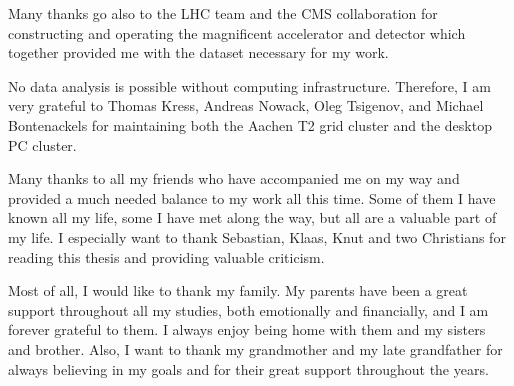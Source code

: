 Many thanks go also to the LHC team and the CMS collaboration for constructing and operating the magnificent accelerator and detector which together provided me with the dataset necessary for my work.    

No data analysis is possible without computing infrastructure. Therefore, I am very grateful to Thomas Kress, Andreas Nowack, Oleg Tsigenov, and Michael Bontenackels for maintaining both the Aachen T2 grid cluster and the desktop PC cluster.   

Many thanks to all my friends who have accompanied me on my way and provided a much needed balance to my work all this time. Some of them I have known all my life, some I have met along the way, but all are a valuable part of my life. I especially want to thank Sebastian, Klaas, Knut and two Christians for reading this thesis and providing valuable criticism. 

Most of all, I would like to thank my family. My parents have been a great support throughout all my studies, both emotionally and financially, and I am forever grateful to them. I always enjoy being home with them and my sisters and brother. Also, I want to thank my grandmother and my late grandfather for always believing in my goals and for their great support throughout the years.  